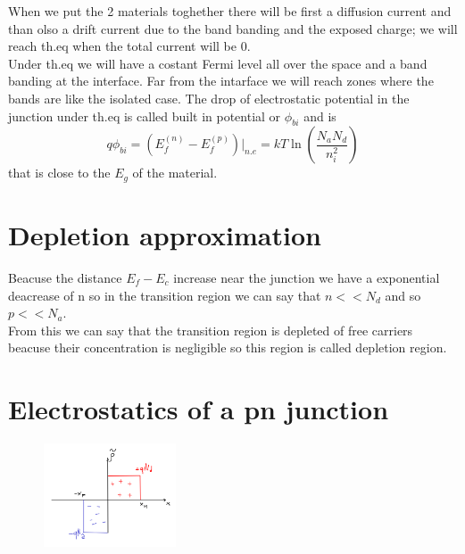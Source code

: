 When we put the 2 materials toghether there will be first a diffusion current and than olso a drift current due to the band banding and the exposed charge; we will reach th.eq when the total current will be 0.\\Under th.eq we will have a costant Fermi level all over the space and a band banding at the interface. Far from the intarface we will reach zones where the bands are like the isolated case. The drop of electrostatic potential in the junction under th.eq is called built in potential or $\phi_{bi}$ and is 
\begin{equation}
q\phi_{bi}=(E_f^{(n)}-E_f^{(p)})|_{n.e}=kT\ln(\frac{N_aN_d}{n_i^2})
\end{equation} 
that is close to the $E_g$ of the material.\\
\section{Depletion approximation}
Beacuse the distance $E_f-E_c$ increase near the junction we have a exponential deacrease of n so in the transition region we can say that $n<<N_d$ and so $p<<N_a$.\\
From this we can say that the transition region is depleted of free carriers beacuse their concentration is negligible so this region is called depletion region.
\section{Electrostatics of a pn junction}

\begin{figure}
\includegraphics[width=0.35\textwidth]{pn3.png}
\end{figure}

